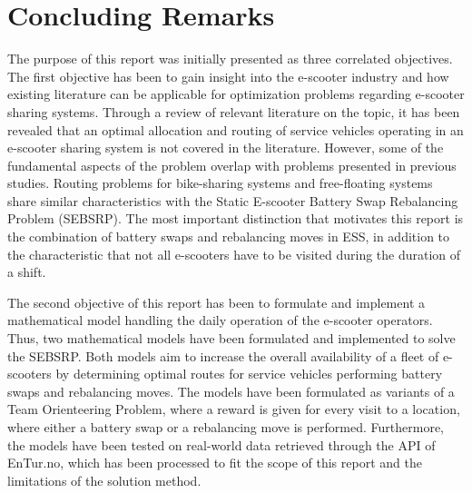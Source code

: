 \chapter{Concluding Remarks}\label{concluding_remarks}

The purpose of this report was initially presented as three correlated objectives. The first objective has been to gain insight into the e-scooter industry and how existing literature can be applicable for optimization problems regarding e-scooter sharing systems. Through a review of relevant literature on the topic, it has been revealed that an optimal allocation and routing of service vehicles operating in an e-scooter sharing system is not covered in the literature. However, some of the fundamental aspects of the problem overlap with problems presented in previous studies. Routing problems for bike-sharing systems and free-floating systems share similar characteristics with the Static E-scooter Battery Swap Rebalancing Problem (SEBSRP). The most important distinction that motivates this report is the combination of battery swaps and rebalancing moves in ESS, in addition to the characteristic that not all e-scooters have to be visited during the duration of a shift.

The second objective of this report has been to formulate and implement a mathematical model handling the daily operation of the e-scooter operators. Thus, two mathematical models have been formulated and implemented to solve the SEBSRP. Both models aim to increase the overall availability of a fleet of e-scooters by determining optimal routes for service vehicles performing battery swaps and rebalancing moves. The models have been formulated as variants of a Team Orienteering Problem, where a reward is given for every visit to a location, where either a battery swap or a rebalancing move is performed. Furthermore, the models have been tested on real-world data retrieved through the API of EnTur.no, which has been processed to fit the scope of this report and the limitations of the solution method.  

